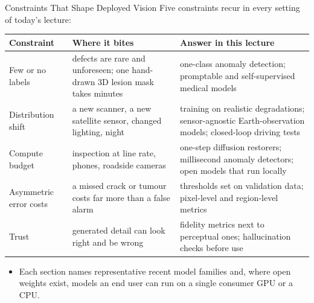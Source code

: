 \begin{frame}{Constraints That Shape Deployed Vision}
  Five constraints recur in every setting of today's lecture:\par
  \vspace{0.5em}
  {\centering\scriptsize
  \begin{tabular}{>{\raggedright\arraybackslash}p{2.6cm} >{\raggedright\arraybackslash}p{4.6cm} >{\raggedright\arraybackslash}p{4.8cm}}
    \toprule
    \textbf{Constraint} & \textbf{Where it bites} & \textbf{Answer in this lecture} \\
    \midrule
    Few or no labels & defects are rare and unforeseen; one hand-drawn 3D lesion mask takes minutes & one-class anomaly detection; promptable and self-supervised medical models \\
    \addlinespace[0.25em]
    Distribution shift & a new scanner, a new satellite sensor, changed lighting, night & training on realistic degradations; sensor-agnostic Earth-observation models; closed-loop driving tests \\
    \addlinespace[0.25em]
    Compute budget & inspection at line rate, phones, roadside cameras & one-step diffusion restorers; millisecond anomaly detectors; open models that run locally \\
    \addlinespace[0.25em]
    Asymmetric error costs & a missed crack or tumour costs far more than a false alarm & thresholds set on validation data; pixel-level and region-level metrics \\
    \addlinespace[0.25em]
    Trust & generated detail can look right and be wrong & fidelity metrics next to perceptual ones; hallucination checks before use \\
    \bottomrule
  \end{tabular}\par}
  \vspace{0.6em}
  \begin{itemize}\footnotesize\itemsep0.3em
    \item Each section names representative recent model families and, where open weights exist, models an end user can run on a single consumer GPU or a CPU.
  \end{itemize}
\end{frame}
